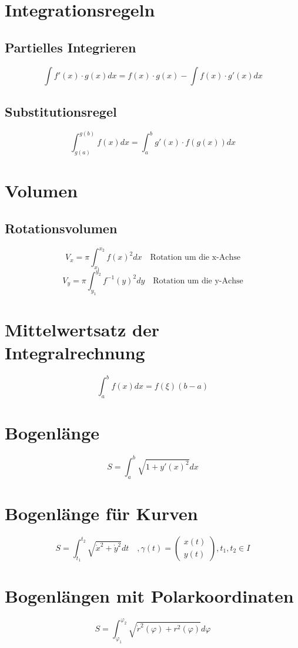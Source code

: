 \section{Integrationsregeln}
\subsection{Partielles Integrieren}
\[ \boxed{\int f'(x) \cdot g(x) dx = f(x) \cdot g(x) - \int f(x) \cdot g'(x) dx} \]
\subsection{Substitutionsregel}
\[ \boxed{\int_{g(a)}^{g(b)} f(x) dx = \int_{a}^{b} g'(x) \cdot f(g(x)) dx} \]


\section{Volumen}
\subsection{Rotationsvolumen}
\[ \boxed{V_x = \pi \int_{x_1}^{x_2} f(x)^2 dx} \quad \text{Rotation um die x-Achse}\]
\[ \boxed{V_y = \pi \int_{y_1}^{y_2} f^{-1}(y)^2 dy} \quad \text{Rotation um die y-Achse}\]

\section{Mittelwertsatz der Integralrechnung}
\[ \boxed{\int_{a}^{b} f(x) dx = f(\xi)(b-a)} \]

\section{Bogenlänge}
\[ \boxed{S = \int_{a}^{b} \sqrt{1 + y'(x)^2} dx} \]

\section{Bogenlänge für Kurven}
\[ \boxed{S = \int_{t_1}^{t_2}\sqrt{\dot{x}^2 + \dot{y}^2} dt \quad ,\gamma(t) = \left(\begin{matrix}x(t)\\y(t)\end{matrix}\right), t_1, t_2 \in I} \]

\section{Bogenlängen mit Polarkoordinaten}
\[ \boxed{S = \int_{\varphi_1}^{\varphi_2}\sqrt{\dot{r}^2(\varphi) + r^2(\varphi)}d\varphi} \]

